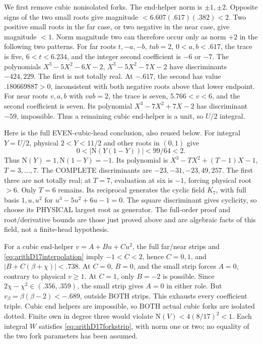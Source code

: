 \documentclass[11pt]{article}
\begin{document}
We first remove cubic nonisolated forks.
The end-helper norm is \(\pm1,\pm2\).
Opposite signs of the two small roots give
magnitude \(<6.607(.617)(.382)<2\).
Two positive small roots in the far case,
or two negative in the near case, give magnitude
\(<1\).
Norm magnitude two can therefore occur only
as norm \(+2\) in the following two patterns.
For far roots \(t,-a,-b\), \(tab=2\),
\(0<a,b<.617\), the trace is five,
\(6<t<6.234\), and the integer second
coefficient is \(-6\) or \(-7\).
The polynomials
\(X^3-5X^2-6X-2\),
\(X^3-5X^2-7X-2\)
have discriminants \(-424,229\).
The first is not totally real.
At \(-.617\), the second has value
\(.180669887>0\), inconsistent with both
negative roots above that lower endpoint.
For near roots \(v,a,b\) with \(vab=2\),
the trace is seven, \(5.766<v<6\),
and the second coefficient is seven.
Its polynomial \(X^3-7X^2+7X-2\)
has discriminant \(-59\), impossible.
Thus a remaining cubic end-helper is a unit,
so \(U/2\) integral.

Here is the full EVEN-cubic-head conclusion,
also reused below.
For integral \(Y=U/2\), physical \(2<Y<11/2\)
and other roots in \((0,1)\) give
\[
                       0<|\mathrm N(Y(1-Y))|<99/64<2.
\]
Thus \(\mathrm N(Y)=1,\mathrm N(1-Y)=-1\).
Its polynomial is
\(X^3-TX^2+(T-1)X-1\), \(T=3,\ldots,7\).
The COMPLETE discriminants are
\(-23,-31,-23,49,257\).
The first three are not totally real;
at \(T=7\), evaluation at six is \(-1\),
forcing physical root \(>6\).
Only \(T=6\) remains.
Its reciprocal generates the cyclic field
\(K_7\), with full basis \(1,u,u^2\) for
\(u^3-5u^2+6u-1=0\).
The square discriminant gives cyclicity, so
choose its PHYSICAL largest root as generator.
The full-order proof and root/derivative bounds
are those just proved above and are algebraic
facts of this field, not a finite-head hypothesis.

For a cubic end-helper \(v=A+Bu+Cu^2\),
the full far/near strips and
\eqref{eq:arithD17interpolation} imply
\(-1<C<2\), hence \(C=0,1\), and
\(|B+C(\beta+\chi)|<.738\).
At \(C=0\), \(B=0\), and the small strip
forces \(A=0\), contrary to physical \(v\ge1\).
At \(C=1\), only \(B=-2\) is possible.
Since \(2\chi-\chi^2\in(.356,.359)\),
the small strip gives \(A=0\) in either role.
But \(v_\beta=\beta(\beta-2)<-.689\),
outside BOTH strips.
This exhausts every coefficient triple.
Cubic end helpers are impossible, so BOTH
actual cubic forks are isolated dotted.
Finite own in degree three would violate
\(\mathrm N(V)<4(8/17)^2<1\).
Each integral \(W\) satisfies
\eqref{eq:arithD17forkstrip},
with norm one or two; no equality of the two
fork parameters has been assumed.
\end{document}
